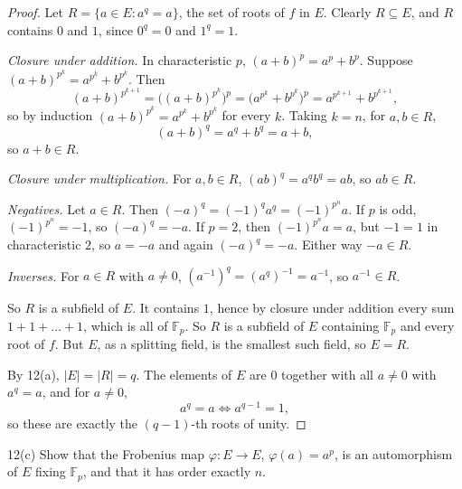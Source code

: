 \documentclass[11pt]{article}
\begin{document}
\begin{proof}
Let $R = \{a \in E : a^q = a\}$, the set of roots of $f$ in $E$. Clearly
$R \subseteq E$, and $R$ contains $0$ and $1$, since $0^q = 0$ and $1^q = 1$.

\emph{Closure under addition.} In characteristic $p$,
$(a+b)^p = a^p + b^p$. Suppose $(a+b)^{p^k} = a^{p^k} + b^{p^k}$. Then
\[
  (a+b)^{p^{k+1}} = \bigl((a+b)^{p^k}\bigr)^p
  = \bigl(a^{p^k} + b^{p^k}\bigr)^p = a^{p^{k+1}} + b^{p^{k+1}},
\]
so by induction $(a+b)^{p^k} = a^{p^k} + b^{p^k}$ for every $k$. Taking
$k = n$, for $a, b \in R$,
\[
  (a+b)^q = a^q + b^q = a + b,
\]
so $a + b \in R$.

\emph{Closure under multiplication.} For $a, b \in R$,
$(ab)^q = a^q b^q = ab$, so $ab \in R$.

\emph{Negatives.} Let $a \in R$. Then $(-a)^q = (-1)^q a^q = (-1)^{p^n} a$.
If $p$ is odd, $(-1)^{p^n} = -1$, so $(-a)^q = -a$. If $p = 2$, then
$(-1)^{p^n} a = a$, but $-1 = 1$ in characteristic $2$, so $a = -a$ and again
$(-a)^q = -a$. Either way $-a \in R$.

\emph{Inverses.} For $a \in R$ with $a \neq 0$,
$(a^{-1})^q = (a^q)^{-1} = a^{-1}$, so $a^{-1} \in R$.

So $R$ is a subfield of $E$. It contains $1$, hence by closure under addition
every sum $1 + 1 + \dots + 1$, which is all of $\mathbb{F}_p$. So $R$ is a
subfield of $E$ containing $\mathbb{F}_p$ and every root of $f$. But $E$, as a
splitting field, is the smallest such field, so $E = R$.

By 12(a), $|E| = |R| = q$. The elements of $E$ are $0$ together with all
$a \neq 0$ with $a^q = a$, and for $a \neq 0$,
\[
  a^q = a \iff a^{q-1} = 1,
\]
so these are exactly the $(q-1)$-th roots of unity.
\end{proof}

\begin{problem}{12(c)}
  Show that the Frobenius map $\varphi \colon E \to E$, $\varphi(a) = a^p$, is
  an automorphism of $E$ fixing $\mathbb{F}_p$, and that it has order exactly
  $n$.
\end{problem}
\end{document}
